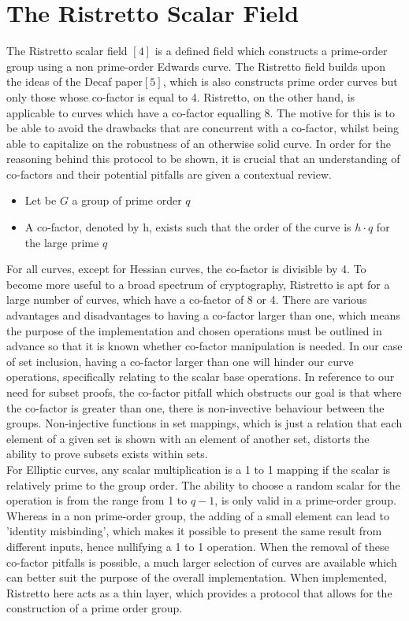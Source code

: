 \documentclass{article}
\begin{document}
\section{The Ristretto Scalar Field}
The Ristretto scalar field $[4]$ is a defined field which constructs a prime-order group using a non prime-order Edwards curve. The Ristretto field builds upon the ideas of the Decaf paper$[5]$, which is also constructs prime order curves but only those whose co-factor is equal to 4. Ristretto, on the other hand, is applicable to curves which have a co-factor equalling 8. The motive for this is to be able to avoid the drawbacks that are concurrent with a co-factor, whilst being able to capitalize on the robustness of an otherwise solid curve. In order for the reasoning behind this protocol to be shown, it is crucial that an understanding of co-factors and their potential pitfalls are given a contextual review. \\
\begin{itemize}
    \item Let be $G$ a group of prime order $q$ 
    \item  A co-factor, denoted by h, exists such that the order of the curve is $h \cdot q$ for the large prime $q$ 
\end{itemize} 
\hfill \break
For all curves, except for Hessian curves, the co-factor is divisible by 4. To become more useful to a broad spectrum of cryptography, Ristretto is apt for a large number of curves, which have a co-factor of 8 or 4. There are various advantages and disadvantages to having a co-factor larger than one, which means the purpose of the implementation and chosen operations must be outlined in advance so that it is known whether co-factor manipulation is needed. In our case of set inclusion, having a co-factor larger than one will hinder our curve operations, specifically relating to the scalar base operations. In reference to our need for subset proofs, the co-factor pitfall which obstructs our goal is that where the co-factor is greater than one, there is non-invective behaviour between the groups. Non-injective functions in set mappings, which is just a relation that each element of a given set is shown with an element of another set, distorts the ability to prove subsets exists within sets. \\
For Elliptic curves, any scalar multiplication is a 1 to 1 mapping if the scalar is relatively prime to the group order. The ability to choose a random scalar for the operation is from the range from 1 to $q-1$, is only valid in a prime-order group. Whereas in a non prime-order group, the adding of a small element can lead to 'identity misbinding', which makes it possible to present the same result from different inputs, hence nullifying a 1 to 1 operation. When the removal of these co-factor pitfalls is possible, a much larger selection of curves are available which can better suit the purpose of the overall implementation. When implemented, Ristretto here acts as a thin layer, which provides a protocol that allows for the construction of a prime order group.  \\\\
\end{document}

